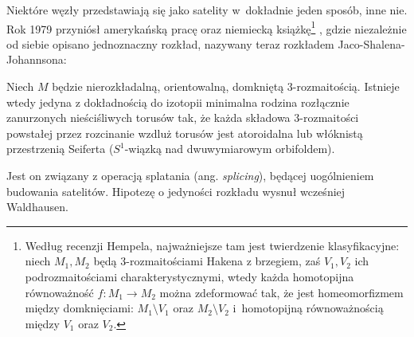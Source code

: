Niektóre węzły przedstawiają się jako satelity w~dokładnie jeden sposób, inne nie.
Rok 1979 przyniósł amerykańską pracę \cite{jaco79} oraz niemiecką książkę\footnote{Według recenzji Hempela, najważniejsze tam jest twierdzenie klasyfikacyjne: niech $M_1, M_2$ będą 3-rozmaitościami Hakena z brzegiem, zaś $V_1, V_2$ ich podrozmaitościami charakterystycznymi, wtedy każda homotopijna równoważność $f \colon M_1 \to M_2$ można zdeformować tak, że jest homeomorfizmem między domknięciami: $M_1 \setminus V_1$ oraz $M_2 \setminus V_2$ i~homotopijną równoważnością między $V_1$ oraz $V_2$.} \cite{johannson79}, gdzie niezależnie od siebie opisano jednoznaczny rozkład, nazywany teraz rozkładem Jaco-Shalena-Johannsona:
%
%
%

\begin{proposition}
    Niech $M$ będzie nierozkładalną, orientowalną, domkniętą 3-rozmaitością.
    Istnieje wtedy jedyna z dokładnością do izotopii minimalna rodzina rozłącznie zanurzonych nieściśliwych torusów tak, że każda składowa 3-rozmaitości powstałej przez rozcinanie wzdluż torusów jest atoroidalna lub włóknistą przestrzenią Seiferta ($S^1$-wiązką nad dwuwymiarowym orbifoldem).
\end{proposition}

Jest on związany z operacją splatania (ang. \emph{splicing}), będącej uogólnieniem budowania satelitów.
Hipotezę o jedyności rozkładu wysnuł wcześniej Waldhausen.
%


